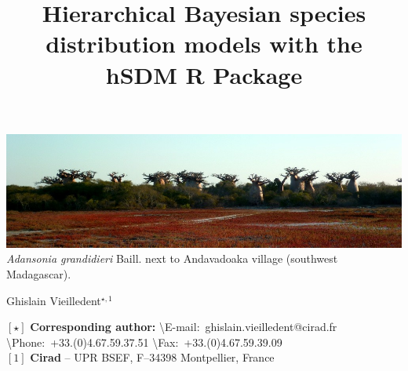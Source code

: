 \documentclass[a4paper, 12pt, leqno]{article}\usepackage[]{graphicx}\usepackage[]{color}
\title{Hierarchical Bayesian species distribution models with the \textbf{hSDM} R Package}
\date{}
\author{}
\begin{document}
\maketitle
\vspace{-1cm}
\begin{center}
  \includegraphics[width=\textwidth]{figures/header.jpg}\\
  \textit{Adansonia grandidieri} Baill. next to Andavadoaka village (southwest Madagascar).
\end{center}
\vspace{1cm}
\begin{center}
  \large{Ghislain Vieilledent$^{\star,1}$}
\end{center}

\vspace{0.3cm}



{\footnotesize
  \begin{flushleft}
    $[\star]$ \textbf{Corresponding author:}
    \textbackslash{E-mail}:~ghislain.vieilledent@cirad.fr
    \textbackslash{Phone}:~+33.(0)4.67.59.37.51
    \textbackslash{Fax}:~+33.(0)4.67.59.39.09\\
    $[1]$ \textbf{Cirad} -- UPR BSEF, F–34398 Montpellier, France\\
\end{flushleft}}
\end{document}
